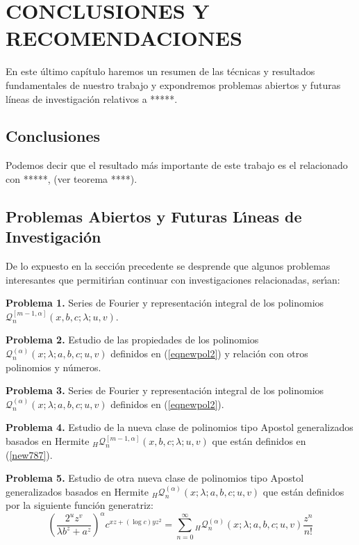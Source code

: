 
\chapter{CONCLUSIONES Y RECOMENDACIONES}
\label{AB4}

\def\thechapter{\arabic{chapter}}

En este \'ultimo cap\'itulo haremos un resumen de las t\'ecnicas y resultados fundamentales de nuestro trabajo y expondremos problemas abiertos y futuras l\'ineas de investigaci\'on relativos a *****.

\section{Conclusiones}
Podemos decir que el resultado m\'as importante de este trabajo es el relacionado con *****, (ver teorema ****).



\section{Problemas Abiertos y Futuras L\'{\i}neas de Investigaci\'on}

De lo expuesto en la secci\'on precedente se desprende que algunos  problemas interesantes que permitir\'{\i}an  continuar con investigaciones relacionadas, ser\'{\i}an:


\textbf{Problema 1.}
Series de Fourier y representaci\'on integral de los polinomios $\mathcal{Q}_n^{[m-1,\alpha]}(x,b,c;\lambda;u,v)$.

\textbf{Problema 2.}
Estudio de las propiedades de los polinomios $\mathcal{Q}_n^{(\alpha)}(x;\lambda;a,b,c;u,v)$ definidos en (\ref{eqnewpol2}) y relaci\'on con otros polinomios y n\'umeros.

\textbf{Problema 3.}
Series de Fourier y representaci\'on integral de los polinomios $\mathcal{Q}_n^{(\alpha)}(x;\lambda;a,b,c;u,v)$ definidos en (\ref{eqnewpol2}).

\textbf{Problema 4.}
Estudio de la nueva clase de polinomios tipo Apostol generalizados basados en Hermite ${_{H}}\mathcal{Q}_n^{[m-1,\alpha]}(x,b,c;\lambda;u,v)$ que est\'an definidos en (\ref{new787}).

\textbf{Problema 5.}
Estudio de otra nueva clase de polinomios tipo Apostol generalizados basados en Hermite ${_{H}}\mathcal{Q}_n^{(\alpha)}(x;\lambda;a,b,c;u,v)$ que est\'an definidos por la siguiente funci\'on generatriz:
\begin{equation}\label{eqnewpol23}
\displaystyle\left(\frac{2^uz^v}{\lambda b^z+a^z}\right)^{\alpha}c^{xz+(\log c)yz^2} =\sum\limits_{n=0}^{\infty}
{_{H}}\mathcal{Q}_n^{(\alpha)}(x;\lambda;a,b,c;u,v)\frac{z^n}{n!} 
\end{equation}



